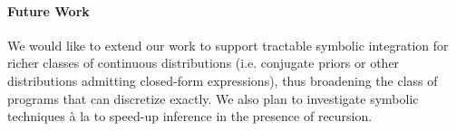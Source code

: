 



\paragraph{Future Work}
We would like to extend our work to support tractable symbolic integration for richer classes of continuous distributions (i.e. conjugate priors or other distributions admitting closed-form expressions), thus broadening the class of programs that \Slice{} can discretize exactly. We also plan to investigate symbolic techniques à la \citet{Wang2024StaticPosterior} to speed-up inference in the presence of recursion.
